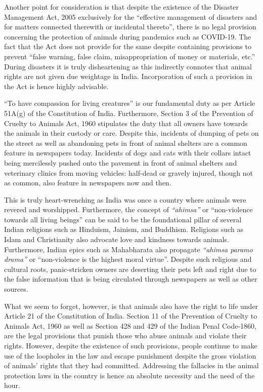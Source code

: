 \begin{multicols}{2}
\noi
Another point for consideration is that despite the existence of the Disaster Management Act,
2005 exclusively for the “effective management of disasters and for matters connected
therewith or incidental thereto”, there is no legal provision concerning the protection of
animals during pandemics such as COVID-19. The fact that the Act does not provide for the
same despite containing provisions to prevent “false warning, false claim, misappropriation
of money or materials, etc.” During disasters it is truly disheartening as this indirectly
connotes that animal rights are not given due weightage in India. Incorporation of such a
provision in the Act is hence highly advisable. 



\noi
“To have compassion for living creatures” is our fundamental duty as per Article 51A(g) of
the Constitution of India. Furthermore, Section 3 of the Prevention of Cruelty to Animals
Act, 1960 stipulates the duty that all owners have towards the animals in their custody or
care. Despite this, incidents of dumping of pets on the street as well as abandoning pets in
front of animal shelters are a common feature in newspapers today. Incidents of dogs and cats
with their collars intact being mercilessly pushed onto the pavement in front of animal
shelters and veterinary clinics from moving vehicles: half-dead or gravely injured, though not
as common, also feature in newspapers now and then.

\noi
This is truly heart-wrenching as India was once a country where animals were revered and
worshipped. Furthermore, the concept of \textit{“ahimsa”} or “non-violence towards all living
beings” can be said to be the foundational pillar of several Indian religions such as Hinduism,
Jainism, and Buddhism. Religions such as Islam and Christianity also advocate love and
kindness towards animals. Furthermore, Indian epics such as Mahabharata also propagate \textit{“ahimsa paramo drama”} or “non-violence is the highest moral virtue”. Despite such religious and cultural roots, panic-stricken owners are deserting their pets left and right due to
the false information that is being circulated through newspapers as well as other sources. 

\noi
What we seem to forget, however, is that animals also have the right to life under Article 21
of the Constitution of India. Section 11 of the Prevention of Cruelty to Animals Act, 1960 as
well as Section 428 and 429 of the Indian Penal Code-1860, are the legal provisions that
punish those who abuse animals and violate their rights. However, despite the existence of
such provisions, people continue to make use of the loopholes in the law and escape
punishment despite the gross violation of animals’ rights that they had committed.
Addressing the fallacies in the animal protection laws in the country is hence an absolute
necessity and the need of the hour. 


\end{multicols}
